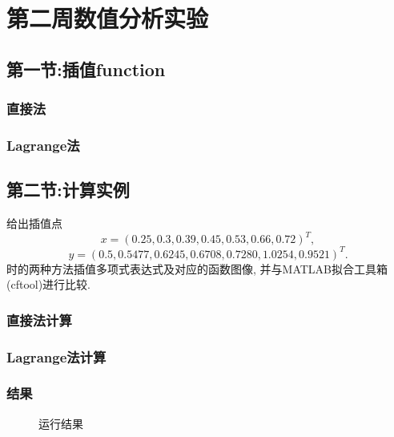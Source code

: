 \section{第二周数值分析实验}
\subsection{第一节:插值function}
\subsubsection{直接法}

\subsubsection{Lagrange法}

\subsection{第二节:计算实例}
\begin{ex}
	给出插值点
	$$x = (0.25, 0.3, 0.39, 0.45, 0.53, 0.66, 0.72)^T,$$  
	$$y = (0.5, 0.5477, 0.6245, 0.6708, 0.7280, 1.0254, 0.9521)^T .$$ 
	时的两种方法插值多项式表达式及对应的函数图像, 并与MATLAB拟合工具箱(cftool)进行比较.
\end{ex}
\subsubsection{直接法计算}

\subsubsection{Lagrange法计算}

\subsubsection{结果}
\begin{figure}[H]
	\centering
	\hfill
	\caption{运行结果}
	\label{fig:cj12}
\end{figure}
